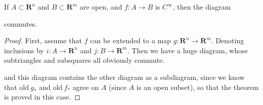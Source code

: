 \begin{lemma}
    If $A \subset \mathbf{R}^n$ and $B \subset \mathbf{R}^m$ are open, and $f: A \to B$ is $C^\infty$, then the diagram
    \begin{center}
    \end{center}
    commutes.
\end{lemma}
\begin{proof}
    First, assume that $f$ can be extended to a map $g: \mathbf{R}^n \to \mathbf{R}^m$. Denoting inclusions by $i: A \to \mathbf{R}^n$ and $j : B \to \mathbf{R}^m$. Then we have a huge diagram, whose subtriangles and subsquares all obviously commute.
    \begin{center}
    \end{center}
    and this diagram contains the other diagram as a subdiagram, since we know that $\text{old}\ g_*$ and $\text{old}\ f_*$ agree on $A$ (since $A$ is an open subset), so that the theorem is proved in this case.


\end{proof}
